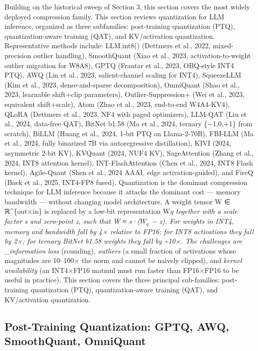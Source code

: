 Building on the historical sweep of Section 3, this section covers the most widely deployed compression family. This section reviews quantization for LLM inference, organized as three subfamilies: post-training quantization (PTQ), quantization-aware training (QAT), and KV/activation quantization. Representative methods include: LLM.int8() (Dettmers et al., 2022, mixed-precision outlier handling), SmoothQuant (Xiao et al., 2023, activation-to-weight outlier migration for W8A8), GPTQ (Frantar et al., 2023, OBQ-style INT4 PTQ), AWQ (Lin et al., 2023, salient-channel scaling for INT4), SqueezeLLM (Kim et al., 2023, dense-and-sparse decomposition), OmniQuant (Shao et al., 2023, learnable shift+clip parameters), Outlier-Suppression+ (Wei et al., 2023, equivalent shift+scale), Atom (Zhao et al., 2023, end-to-end W4A4-KV4), QLoRA (Dettmers et al., 2023, NF4 with paged optimizers), LLM-QAT (Liu et al., 2024, data-free QAT), BitNet b1.58 (Ma et al., 2024, ternary \{−1,0,+1\} from scratch), BiLLM (Huang et al., 2024, 1-bit PTQ on Llama-2-70B), FBI-LLM (Ma et al., 2024, fully binarized 7B via autoregressive distillation), KIVI (2024, asymmetric 2-bit KV), KVQuant (2024, NUF4 KV), SageAttention (Zhang et al., 2024, INT8 attention kernel), INT-FlashAttention (Chen et al., 2024, INT8 Flash kernel), Agile-Quant (Shen et al., 2024 AAAI, edge activation-guided), and FireQ (Baek et al., 2025, INT4-FP8 fused). Quantization is the dominant compression technique for LLM inference because it attacks the dominant cost --- memory bandwidth --- without changing model architecture. A weight tensor W ∈ ℝ\^{}\{out×in\} is replaced by a low-bit representation W\emph{q together with a scale factor s and zero-point z, such that W ≈ s·(\(W_q\) − z). For weights in INT4, memory and bandwidth fall by 4× relative to FP16; for INT8 activations they fall by 2×; for ternary BitNet b1.58 weights they fall by \textasciitilde10×. The challenges are \_information loss} (rounding), \emph{outliers} (a small fraction of activations whose magnitudes are 10--100× the norm and cannot be naively clipped), and \emph{kernel availability} (an INT4×FP16 matmul must run faster than FP16×FP16 to be useful in practice). This section covers the three principal sub-families: post-training quantization (PTQ), quantization-aware training (QAT), and KV/activation quantization.

\subsection{Post-Training Quantization: GPTQ, AWQ, SmoothQuant, OmniQuant}\label{post-training-quantization-gptq-awq-smoothquant-omniquant}

